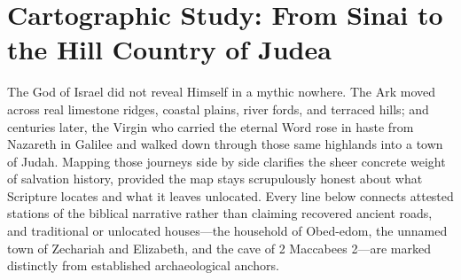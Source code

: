\section{Cartographic Study: From Sinai to the Hill Country of Judea}

The God of Israel did not reveal Himself in a mythic nowhere. The Ark moved across real limestone ridges, coastal plains, river fords, and terraced hills; and centuries later, the Virgin who carried the eternal Word rose in haste from Nazareth in Galilee and walked down through those same highlands into a town of Judah. Mapping those journeys side by side clarifies the sheer concrete weight of salvation history, provided the map stays scrupulously honest about what Scripture locates and what it leaves unlocated. Every line below connects attested stations of the biblical narrative rather than claiming recovered ancient roads, and traditional or unlocated houses---the household of Obed-edom, the unnamed town of Zechariah and Elizabeth, and the cave of 2 Maccabees 2---are marked distinctly from established archaeological anchors.

